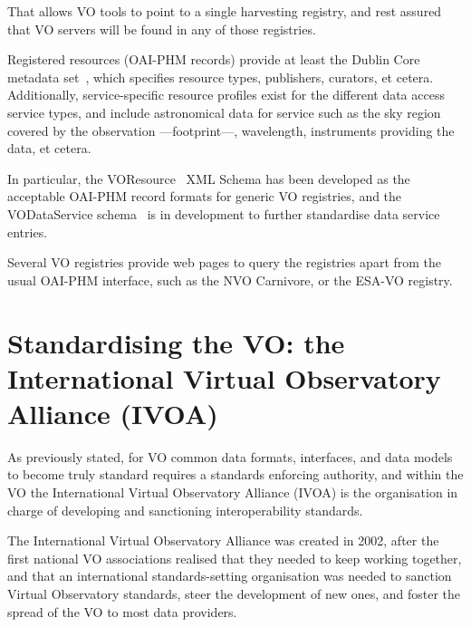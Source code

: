 		 That allows VO tools to point to a single harvesting
		registry, and rest assured that VO servers will be found in
		any of those registries.
		
		 Registered resources (OAI-PHM records) provide at least
		the Dublin Core metadata set~\cite{2007NISO.Z3985...K},
		which specifies resource types, publishers, curators, et
		cetera.
		Additionally, service-specific resource profiles exist for
		the different data access service types, and include
		astronomical data for service such as the sky region
		covered by the observation ---footprint---, wavelength,
		instruments providing the data, et cetera.
		
		 In particular, the VOResource~\cite{2008voresivoar0222P}
		XML Schema has been developed as the acceptable OAI-PHM
		record formats for generic VO registries, and the
		VODataService schema~\cite{2008vods.ivoar1016P} is in
		development to further standardise data service entries.
		
		 Several VO registries provide web pages to query the
		registries apart from the usual OAI-PHM interface, such as
		the NVO
		Carnivore,
		or the ESA-VO
		registry.
	
	
	\section[The International Virtual Observatory Alliance]
	{Standardising the VO:
	 the International Virtual Observatory Alliance (IVOA)}
	\label{sec:the_international_virtual_observatory_alliance}

		As previously stated, for VO common data formats,
		interfaces, and data models to become truly standard
		requires a standards enforcing authority, and within the VO
		the International Virtual Observatory Alliance (IVOA) is
		the organisation in charge of developing and sanctioning
		interoperability standards.
		
		 The International Virtual Observatory Alliance was created
		in 2002, after the first national VO associations realised
		that they needed to keep working together, and that an
		international standards-setting organisation was needed to
		sanction Virtual Observatory standards, steer the
		development of new ones, and foster the spread of the VO to
		most data providers.
		
